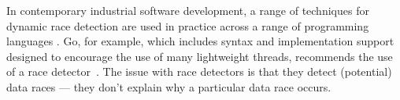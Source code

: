 

In contemporary industrial software development, a range of techniques
for dynamic race detection are used in practice across a range of
programming languages
\cite{hong2015survey}.  Go, for
example, which includes syntax and implementation support designed to
encourage the use of many lightweight threads, recommends the use
of a race detector~\cite{GoCACM2022}.
The issue with race detectors is that they detect (potential)
data races --- they don't explain why a particular data race
occurs.




